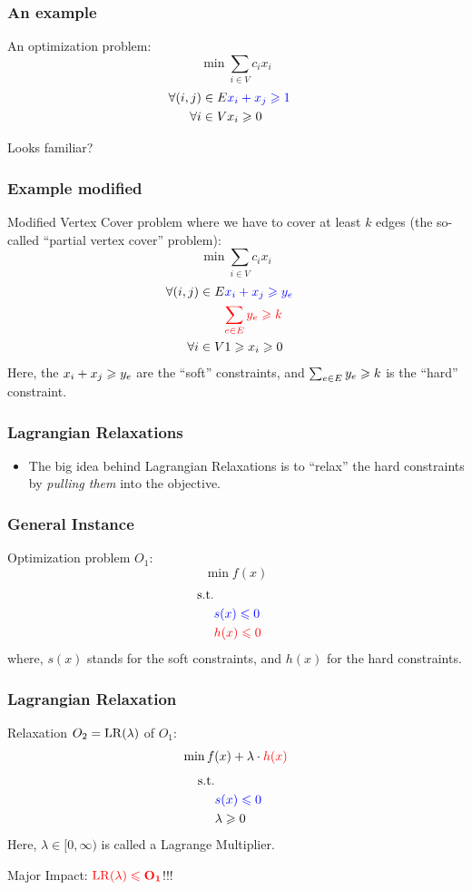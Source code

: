 \documentclass{beamer}
\begin{document}
\begin{frame}
\frametitle{An example}
An optimization problem:
\[ 
\min \sum_{i\in V} c_i x_i 
\]
\begin{eqnarray*}
\forall{(i, j) \in E} & {\color{blue} x_i + x_j \geqslant 1}&\\
\forall{i \in V} & x_i \geqslant 0&
\end{eqnarray*}

Looks familiar?
\end{frame}

\begin{frame}
\frametitle{Example modified}
Modified Vertex Cover problem where we have to cover at least $k$ edges (the so-called 
``partial vertex cover'' problem):
\pause
\[ 
\min \sum_{i\in V} c_i x_i 
\]
\begin{eqnarray*}
\forall{(i, j) \in E} & {\color{blue} x_i + x_j \geqslant y_e}&\\
& {\color{red} \sum_{e \in E} y_e \geqslant  k}&\\
\forall{i \in V} & 1 \geqslant x_i \geqslant 0&
\end{eqnarray*}
Here, the {\color{blue} $x_i + x_j \geqslant y_e$} are the ``soft'' constraints, and 
{\color{red} $\sum_{e \in E} y_e \geqslant  k$} is the ``hard'' constraint. 
\end{frame}


\begin{frame}
\frametitle{Lagrangian Relaxations}
\begin{itemize}
\item The big idea behind Lagrangian Relaxations is to ``relax'' the hard constraints by
{\em pulling them} into the objective. 
\end{itemize}
\end{frame}

\begin{frame}
\frametitle{General Instance}
Optimization problem $O_1$:
\[ 
\min f(x)
\]
\begin{eqnarray*}
\mathrm{s.t.} &&\\
&{\color{blue} s(x) \leqslant 0}&\\
&{\color{red} h(x) \leqslant 0}&
\end{eqnarray*}
where, $s(x)$ stands for the soft constraints, and $h(x)$ for the hard constraints.
\end{frame}

\begin{frame}
\frametitle{Lagrangian Relaxation}
Relaxation $O_2 = \mathrm{LR}(\lambda)$ of $O_1$:
\[ 
\min f(x) + \lambda\cdot{\color{red} h(x)}
\]
\begin{eqnarray*}
\mathrm{s.t.} &&\\
&{\color{blue} s(x) \leqslant 0}&\\
&\lambda \geqslant 0&
\end{eqnarray*}
Here, $\lambda  \in [0, \infty)$ is called a {\color{blue} Lagrange Multiplier}. 
\begin{center}
Major Impact: ${\color{red} \mathbf{\mathrm{LR}(\lambda) \leqslant O_1}}$!!!
\end{center}
\end{frame}
\end{document}
